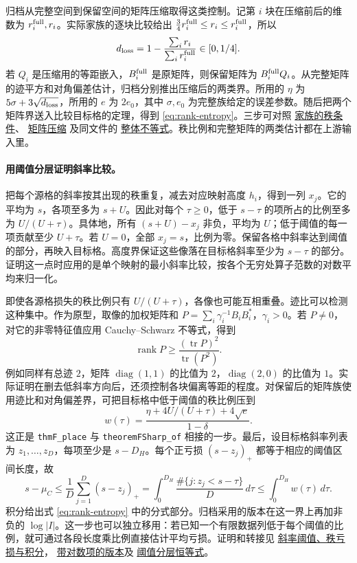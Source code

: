 \documentclass[UTF8,fontset=none,a4paper,11pt]{ctexart}
\theoremstyle{definition}
\newcommand{\src}[3]{\href{https://github.com/leanprover-community/riemann-hypothesis/blob/23aebbb302010b292314d406aa97f7901d698634/src/#1.lean\#L#2}{#3}}
\begin{document}
归档从完整空间到保留空间的矩阵压缩取得这类控制。记第 $i$ 块在压缩前后的维数为 $r_i^{\rm full},r_i$。实际家族的逐块比较给出 $\frac34r_i^{\rm full}\le r_i\le r_i^{\rm full}$，所以
\[
 d_{\rm loss}=1-\frac{\sum_i r_i}{\sum_i r_i^{\rm full}}\in[0,1/4].
\]
若 $Q_i$ 是压缩用的等距嵌入，$B_i^{\rm full}$ 是原矩阵，则保留矩阵为 $B_i^{\rm full}Q_i$。从完整矩阵的迹平方和对角偏差估计，归档分别推出压缩后的两类界。所用的 $\eta$ 为 $5\sigma+3\sqrt{d_{\rm loss}}$，所用的 $e$ 为 $2e_0$，其中 $\sigma,e_0$ 为完整族给定的误差参数。随后把两个矩阵界送入比较目标格的定理，得到 \eqref{eq:rank-entropy}。三步可对照
\src{Formalism/SizeWindowBrackets/ChainSlopeWindows/ChainLatticeSizesModelEventually}{279}{家族的秩条件}、
\src{Formalism/SizeWindowBrackets/ChainSlopeWindows/JointDModelAppliesUnitLattice}{164}{矩阵压缩}
及同文件的 \src{Formalism/SizeWindowBrackets/ChainSlopeWindows/JointDModelAppliesUnitLattice}{215}{整体不等式}。秩比例和完整矩阵的两类估计都在上游输入里。

\paragraph{用阈值分层证明斜率比较。}
把每个源格的斜率按其出现的秩重复，减去对应映射高度 $h_i$，得到一列 $x_j$。它的平均为 $s$，各项至多为 $s+U$。因此对每个 $\tau\ge0$，低于 $s-\tau$ 的项所占的比例至多为 $U/(U+\tau)$。具体地，所有 $(s+U)-x_j$ 非负，平均为 $U$；低于阈值的每一项贡献至少 $U+\tau$。若 $U=0$，全部 $x_j=s$，比例为零。保留各格中斜率达到阈值的部分，再映入目标格。高度界保证这些像落在目标格斜率至少为 $s-\tau$ 的部分。证明这一点时应用的是单个映射的最小斜率比较，按各个无穷处算子范数的对数平均来归一化。

即使各源格损失的秩比例只有 $U/(U+\tau)$，各像也可能互相重叠。迹比可以检测这种集中。作为原型，取像的加权矩阵和 $P=\sum_i \gamma_i^{-1}B_i B_i^*$，$\gamma_i>0$。若 $P\ne0$，对它的非零特征值应用 Cauchy--Schwarz 不等式，得到
\[
 \operatorname{rank}P\ge
 \frac{(\operatorname{tr}P)^2}{\operatorname{tr}(P^2)}.
\]
例如同样有总迹 $2$，矩阵 $\operatorname{diag}(1,1)$ 的比值为 $2$，$\operatorname{diag}(2,0)$ 的比值为 $1$。实际证明在删去低斜率方向后，还须控制各块偏离等距的程度。对保留后的矩阵族使用迹比和对角偏差界，可把目标格中低于阈值的秩比例压到
\[
 w(\tau)=\frac{\eta+4U/(U+\tau)+4\sqrt e}{1-\delta}.
\]
这正是 \texttt{thmF\_place} 与 \texttt{theoremFSharp\_of} 相接的一步。最后，设目标格斜率列表为 $z_1,\ldots,z_D$，每项至少是 $s-D_H$。每个正亏损 $(s-z_j)_+$ 都等于相应的阈值区间长度，故
\[
 s-\mu_C
 \le \frac1D\sum_{j=1}^D(s-z_j)_+
 =\int_0^{D_H}\frac{\#\{j:z_j<s-\tau\}}{D}\,d\tau
 \le \int_0^{D_H} w(\tau)\,d\tau.
\]
积分给出式 \eqref{eq:rank-entropy} 中的分式部分。归档采用的版本在这一界上再加非负的 $\log|I|$。这一步也可以独立移用：若已知一个有限数据列低于每个阈值的比例，就可通过各段长度乘比例直接估计平均亏损。证明和转接见
\src{Formalism/HarderNarasimhan/HarderNarasimhanProofs/TheoremFSharp}{272}{斜率阈值、秩亏损与积分}，
\src{Formalism/HarderNarasimhan/HarderNarasimhanProofs/TheoremFSharp}{388}{带对数项的版本}及
\src{Formalism/CorankShare/CorankShareProofs/LayerCakeFormula}{57}{阈值分层恒等式}。
\end{document}
